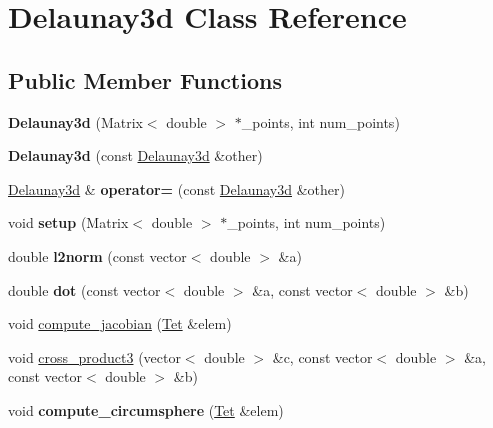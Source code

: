 \hypertarget{classDelaunay3d}{\section{Delaunay3d Class Reference}
\label{classDelaunay3d}
}
\subsection*{Public Member Functions}
\begin{DoxyCompactItemize}
\item 
\hypertarget{classDelaunay3d_abe712c140487218604eafa7b5699a82b}{{\bfseries Delaunay3d} (Matrix$<$ double $>$ $\ast$\-\_\-points, int num\-\_\-points)}\label{classDelaunay3d_abe712c140487218604eafa7b5699a82b}

\item 
\hypertarget{classDelaunay3d_a53ba9360ae73bc4be8e1bf10b0bd71e0}{{\bfseries Delaunay3d} (const \hyperlink{classDelaunay3d}{Delaunay3d} \&other)}\label{classDelaunay3d_a53ba9360ae73bc4be8e1bf10b0bd71e0}

\item 
\hypertarget{classDelaunay3d_af4f12bb96cecb18e6b3afd607a4df832}{\hyperlink{classDelaunay3d}{Delaunay3d} \& {\bfseries operator=} (const \hyperlink{classDelaunay3d}{Delaunay3d} \&other)}\label{classDelaunay3d_af4f12bb96cecb18e6b3afd607a4df832}

\item 
\hypertarget{classDelaunay3d_af28bf31d5febf051c9a2d1a6c421b090}{void {\bfseries setup} (Matrix$<$ double $>$ $\ast$\-\_\-points, int num\-\_\-points)}\label{classDelaunay3d_af28bf31d5febf051c9a2d1a6c421b090}

\item 
\hypertarget{classDelaunay3d_a66361bf4bb01c8851333d1e37d9a439d}{double {\bfseries l2norm} (const vector$<$ double $>$ \&a)}\label{classDelaunay3d_a66361bf4bb01c8851333d1e37d9a439d}

\item 
\hypertarget{classDelaunay3d_a71612b6b61b2128a699d5c5513879a07}{double {\bfseries dot} (const vector$<$ double $>$ \&a, const vector$<$ double $>$ \&b)}\label{classDelaunay3d_a71612b6b61b2128a699d5c5513879a07}

\item 
void \hyperlink{classDelaunay3d_a096cf0a463d63b968018a2c22f9f99cb}{compute\-\_\-jacobian} (\hyperlink{classTet}{Tet} \&elem)
\item 
void \hyperlink{classDelaunay3d_a70437b8f7fe094a42b1383c12dff999c}{cross\-\_\-product3} (vector$<$ double $>$ \&c, const vector$<$ double $>$ \&a, const vector$<$ double $>$ \&b)
\item 
\hypertarget{classDelaunay3d_a29fcc2ab4187bcdee2a9b0481cfee87b}{void {\bfseries compute\-\_\-circumsphere} (\hyperlink{classTet}{Tet} \&elem)}\label{classDelaunay3d_a29fcc2ab4187bcdee2a9b0481cfee87b}


\end{DoxyCompactItemize}
